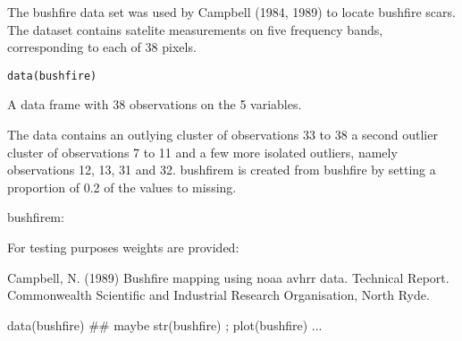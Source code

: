 %
\begin{Description}\relax
The bushfire data set was used by Campbell (1984, 1989) to locate bushfire scars. 
The dataset contains satelite measurements on five frequency bands, corresponding to each of 38 pixels. 
\end{Description}
%
\begin{Usage}
\begin{verbatim}
data(bushfire)
\end{verbatim}
\end{Usage}
%
\begin{Format}
A data frame with 38 observations on the 5 variables.
\end{Format}
%
\begin{Details}\relax
The data contains an outlying cluster of
observations 33 to 38 a second outlier cluster of observations
7 to 11 and a few more isolated outliers, namely
observations 12, 13, 31 and 32. bushfirem is created from bushfire by setting a proportion of 0.2 of the values to missing.
\end{Details}
%
\begin{Source}\relax
bushfirem:

For testing purposes weights are provided: 

\end{Source}
%
\begin{References}\relax
Campbell, N. (1989) Bushfire mapping using noaa avhrr data. Technical Report. Commonwealth Scientific and
Industrial Research Organisation, North Ryde.
\end{References}
%
\begin{Examples}
\begin{ExampleCode}
data(bushfire)
## maybe str(bushfire) ; plot(bushfire) ...
\end{ExampleCode}
\end{Examples}
